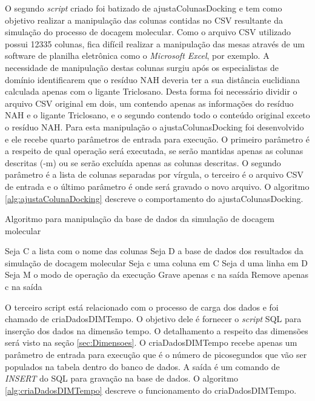O segundo \emph{script} criado foi batizado de ajustaColunasDocking e tem como objetivo realizar a manipulação das colunas contidas no CSV resultante da simulação do processo de docagem molecular. Como o arquivo CSV utilizado possui 12335 colunas, fica difícil realizar a manipulação das mesas através de um software de planilha eletrônica como o \emph{Microsoft Excel}, por exemplo. A necessidade de manipulação destas colunas surgiu após os especialistas de domínio identificarem que o resíduo NAH deveria ter a sua distância euclidiana calculada apenas com o ligante Triclosano. Desta forma foi necessário dividir o arquivo CSV original em dois, um contendo apenas as informações do resíduo NAH e o ligante Triclosano, e o segundo contendo todo o conteúdo original exceto o resíduo NAH. Para esta manipulação o ajustaColunasDocking foi desenvolvido e ele recebe quarto parâmetros de entrada para execução. O primeiro parâmetro é a respeito de qual operação será executada, se serão mantidas apenas as colunas descritas (-m) ou se serão excluída apenas as colunas descritas. O segundo parâmetro é a lista de colunas separadas por vírgula, o terceiro é o arquivo CSV de entrada e o último parâmetro é onde será gravado o novo arquivo. O algoritmo \ref{alg:ajustaColunaDocking} descreve o comportamento do ajustaColunasDocking.

\begin{algorithm}[H]
\caption{Algoritmo para manipulação da base de dados da simulação de docagem molecular}
\label{alg:ajustaColunaDocking}
{\fontsize{10}{10}\selectfont
\begin{algorithmic}[1]
	\STATE Seja C a lista com o nome das colunas
	\STATE Seja D a base de dados dos resultados da simulação de docagem molecular
	\STATE Seja c uma coluna em C
	\STATE Seja d uma linha em D
	\STATE Seja M o modo de operação da execução
			\STATE Grave apenas c na saída
			\ENDFOR
		\ENDFOR
	\ENDIF
			\STATE Remove apenas c na saída
			\ENDFOR
		\ENDFOR
	\ENDIF
\end{algorithmic}
}
\end{algorithm}

O terceiro script está relacionado com o processo de carga dos dados e foi chamado de criaDadosDIMTempo. O objetivo dele é fornecer o \emph{script} SQL para inserção dos dados na dimensão tempo. O detalhamento a respeito das dimensões será visto na seção \ref{sec:Dimensoes}. O criaDadosDIMTempo recebe apenas um parâmetro de entrada para execução que é o número de picosegundos que vão ser populados na tabela dentro do banco de dados. A saída é um comando de \emph{INSERT} do SQL para gravação na base de dados. O algoritmo \ref{alg:criaDadosDIMTempo} descreve o funcionamento do criaDadosDIMTempo.

